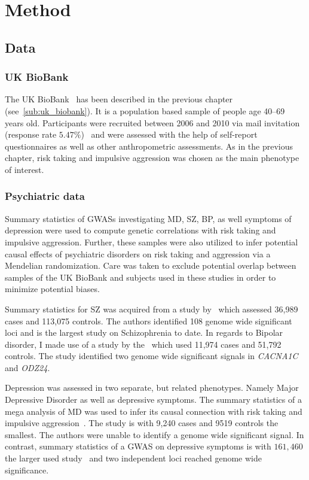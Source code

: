 \section{Method}
\label{sec:method}

\subsection{Data}
\label{sub:data}

\subsubsection{UK BioBank}
\label{ssub:uk_biobank_psych}

The UK BioBank~\cite{Allen2014} has been described in the previous chapter (see~\ref{sub:uk_biobank}).
It is a population based sample of people age 40--69 years old. 
Participants were recruited between 2006 and 2010 via mail invitation (response rate $5.47\%$)~\cite{Sudlow2015} and were assessed with the help of self-report questionnaires as well as other anthropometric assessments.
As in the previous chapter, risk taking and impulsive aggression was chosen as the main phenotype of interest.

\subsubsection{Psychiatric data}
\label{ssub:psychiatric_data}

Summary statistics of GWASs investigating MD, SZ, BP, as well symptoms of depression were used to compute genetic correlations with risk taking and impulsive aggression.
Further, these samples were also utilized to infer potential causal effects of psychiatric disorders on risk taking and aggression via a Mendelian randomization.
Care was taken to exclude potential overlap between samples of the UK BioBank and subjects used in these studies in order to minimize potential biases.

Summary statistics for SZ was acquired from a study by~\citet{Ripke2014} which assessed 36,989 cases and 113,075 controls.
The authors identified 108 genome wide significant loci and is the largest study on Schizophrenia to date.
In regards to Bipolar disorder, I made use of a study by the~\citet{PsychiatricGWASConsortiumBipolarDisorderWorkingGroup2011} which used 11,974 cases and 51,792 controls.
The study identified two genome wide significant signals in \textit{CACNA1C} and \textit{ODZ24}.

Depression was assessed in two separate, but related phenotypes. 
Namely Major Depressive Disorder as well as depressive symptoms.
The summary statistics of a mega analysis of MD was used to infer its causal connection with risk taking and impulsive aggression~\cite{MajorDepressiveDisorderWorkingGroupofthePsychiatricGWASConsortium2013}.
The study is with 9,240 cases and 9519 controls the smallest. 
The authors were unable to identify a genome wide significant signal.
In contrast, summary statistics of a GWAS on depressive symptoms is with $161,460$ the larger used study~\cite{Okbay2016} and two independent loci reached genome wide significance.  

